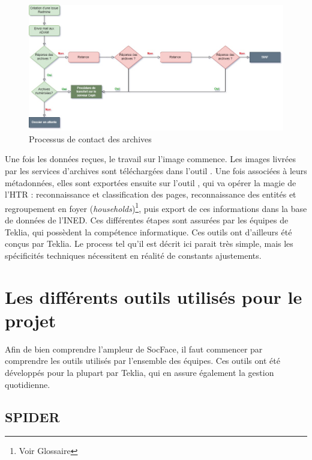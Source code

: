 \begin{figure}[H]
        \centering
        \includegraphics[width=0.8\linewidth]{Figures/Partie 1/Fig.1.4 - Contact Archives .jpg}
        \caption[Processus de contact des archives]{Processus de contact des archives}
        \label{fig:Fig1.4}
    \end{figure}

Une fois les données reçues, le travail sur l’image commence. Les images livrées par les services d’archives sont téléchargées dans l’outil \Spider{}. Une fois associées à leurs métadonnées, elles sont exportées ensuite sur l’outil \Arkindex{}, qui va opérer la magie de l’\gls{HTR} : reconnaissance et classification des pages, reconnaissance des \gls{entités} et regroupement en foyer (\textit{\gls{households}})\footnote{Voir Glossaire}, puis export de ces informations dans la base de données de l’INED. Ces différentes étapes sont assurées par les équipes de Teklia, qui possèdent la compétence informatique. Ces outils ont d’ailleurs été conçus par Teklia. Le process tel qu’il est décrit ici parait très simple, mais les spécificités techniques nécessitent en réalité de constants ajustements.

    \section{Les différents outils utilisés pour le projet}

Afin de bien comprendre l’ampleur de SocFace, il faut commencer par comprendre les outils utilisés par l’ensemble des équipes. Ces outils ont été développés pour la plupart par Teklia, qui en assure également la gestion quotidienne.

        \subsection{SPIDER}

